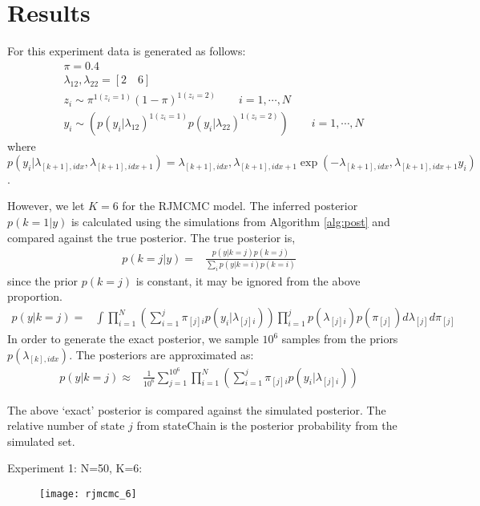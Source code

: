\documentclass{article}
\begin{document}
\clearpage
\section{Results}
For this experiment data is generated as follows:
\begin{align*}
& \pi =  0.4 \\
& \lambda_{12},\lambda_{22} =  [2\quad 6] \\
& z_i \sim \pi^{1(z_i=1)}(1-\pi)^{1(z_i=2)}\qquad i=1,\cdots,N\\
& y_i \sim (p(y_i|\lambda_{12})^{1(z_i=1)}p(y_i|\lambda_{22})^{1(z_i=2)})\qquad i=1,\cdots,N
\end{align*}
where $p(y_i|\lambda_{[k+1],idx},\lambda_{[k+1],idx+1})=\lambda_{[k+1],idx},\lambda_{[k+1],idx+1}\exp(-\lambda_{[k+1],idx},\lambda_{[k+1],idx+1}y_i)$.

However, we let $K=6$ for the RJMCMC model. The inferred posterior $p(k=1|y)$ is calculated using the simulations from Algorithm \ref{alg:post} and compared against the true posterior. The true posterior is,
\begin{align}
p(k=j|y)=&\frac{p(y|k=j)p(k=j)}{\sum_i p(y|k=i)p(k=i)}
\end{align}
since the prior $p(k=j)$ is constant, it may be ignored from the above proportion.
\begin{align*}
p(y|k=j)=& \int \prod_{i=1}^{N}\left(\sum_{i=1}^j\pi_{[j]i} p(y_i|\lambda_{[j]i})\right)\prod_{i=1}^{j}p(\lambda_{[j]i})p(\pi_{[j]}) d\lambda_{[j]}d\pi_{[j]}
\end{align*}
In order to generate the exact posterior, we sample $10^6$ samples from the priors $p(\lambda_{[k],idx})$. The posteriors are approximated as:
\begin{align}
p(y|k=j)\approx & \frac{1}{10^6}\sum_{j=1}^{10^6} \prod_{i=1}^{N}\left(\sum_{i=1}^j\pi_{[j]i} p(y_i|\lambda_{[j]i})\right)
\end{align}

The above `exact' posterior is compared against the simulated posterior. The relative number of state $j$ from stateChain is the posterior probability from the simulated set.

Experiment 1: N=50, K=6:
\begin{figure}[h]
\centering
\texttt{[image: rjmcmc\_6]}
\end{figure}
\end{document}
